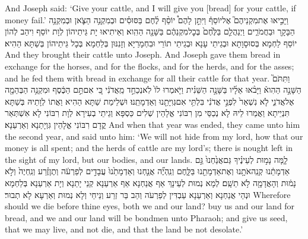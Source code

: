 {And Joseph said: ‘Give your cattle, and I will give you [bread] for your cattle, if money fail.’}{}
{וַיָּבִ֣יאוּ אֶת\maqqaf מִקְנֵיהֶם֮ אֶל\maqqaf יוֹסֵף֒ וַיִּתֵּ֣ן לָהֶם֩ יוֹסֵ֨ף לֶ֜חֶם בַּסּוּסִ֗ים וּבְמִקְנֵ֥ה הַצֹּ֛אן וּבְמִקְנֵ֥ה הַבָּקָ֖ר וּבַחֲמֹרִ֑ים וַיְנַהֲלֵ֤ם בַּלֶּ֙חֶם֙ בְּכׇל\maqqaf מִקְנֵהֶ֔ם בַּשָּׁנָ֖ה הַהִֽוא׃}
{וְאֵיתִיאוּ יָת גֵּיתֵיהוֹן לְוָת יוֹסֵף וִיהַב לְהוֹן יוֹסֵף לַחְמָא בְּסוּסָוָתָא וּבְגֵיתֵי עָנָא וּבְגֵיתֵי תוֹרֵי וּבִחְמָרַיָּא וְזָנִנּוּן בְּלַחְמָא בְּכָל גֵּיתֵיהוֹן בְּשַׁתָּא הַהִיא׃}
{And they brought their cattle unto Joseph. And Joseph gave them bread in exchange for the horses, and for the flocks, and for the herds, and for the asses; and he fed them with bread in exchange for all their cattle for that year.}{}
{וַתִּתֹּם֮ הַשָּׁנָ֣ה הַהִוא֒ וַיָּבֹ֨אוּ אֵלָ֜יו בַּשָּׁנָ֣ה הַשֵּׁנִ֗ית וַיֹּ֤אמְרוּ לוֹ֙ לֹֽא\maqqaf נְכַחֵ֣ד מֵֽאֲדֹנִ֔י כִּ֚י אִם\maqqaf תַּ֣ם הַכֶּ֔סֶף וּמִקְנֵ֥ה הַבְּהֵמָ֖ה אֶל\maqqaf אֲדֹנִ֑י לֹ֤א נִשְׁאַר֙ לִפְנֵ֣י אֲדֹנִ֔י בִּלְתִּ֥י אִם\maqqaf גְּוִיָּתֵ֖נוּ וְאַדְמָתֵֽנוּ׃}
{וּשְׁלֵימַת שַׁתָּא הַהִיא וַאֲתוֹ לְוָתֵיהּ בְּשַׁתָּא תִּנְיֵיתָא וַאֲמַרוּ לֵיהּ לָא נְכַסֵּי מִן רִבּוֹנִי אֱלָהֵין שְׁלִים כַּסְפָּא וְגֵיתֵי בְעִירָא לְוָת רִבּוֹנִי לָא אִשְׁתְּאַר קֳדָם רִבּוֹנִי אֱלָהֵין גִּוְיָתַנָא וְאַרְעַנָא׃}
{And when that year was ended, they came unto him the second year, and said unto him: ‘We will not hide from my lord, how that our money is all spent; and the herds of cattle are my lord’s; there is nought left in the sight of my lord, but our bodies, and our lands.}{}
{לָ֧מָּה נָמ֣וּת לְעֵינֶ֗יךָ גַּם\maqqaf אֲנַ֙חְנוּ֙ גַּ֣ם אַדְמָתֵ֔נוּ קְנֵֽה\maqqaf אֹתָ֥נוּ וְאֶת\maqqaf אַדְמָתֵ֖נוּ בַּלָּ֑חֶם וְנִֽהְיֶ֞ה אֲנַ֤חְנוּ וְאַדְמָתֵ֙נוּ֙ עֲבָדִ֣ים לְפַרְעֹ֔ה וְתֶן\maqqaf זֶ֗רַע וְנִֽחְיֶה֙ וְלֹ֣א נָמ֔וּת וְהָאֲדָמָ֖ה לֹ֥א תֵשָֽׁם׃}
{לְמָא נְמוּת לְעֵינָךְ אַף אֲנַחְנָא אַף אַרְעַנָא קְנֵי יָתַנָא וְיָת אַרְעַנָא בְּלַחְמָא וּנְהֵי אֲנַחְנָא וְאַרְעַנָא עַבְדִּין לְפַרְעֹה וְהַב בַּר זְרַע וְנֵיחֵי וְלָא נְמוּת וְאַרְעָא לָא תְבוּר׃}
{Wherefore should we die before thine eyes, both we and our land? buy us and our land for bread, and we and our land will be bondmen unto Pharaoh; and give us seed, that we may live, and not die, and that the land be not desolate.’}{}
